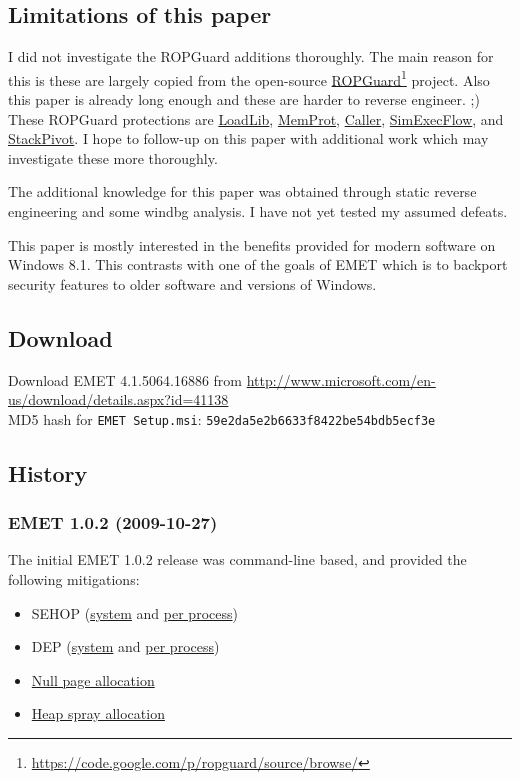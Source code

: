 \documentclass[]{article}
\newcommand{\fhref}[2]{\href{#1}{#2}\footnote{\url{#1}}}
\begin{document}
\subsection{Limitations of this paper}
I did not investigate the ROPGuard additions thoroughly.  The main reason for this is these are largely copied from the open-source  \fhref{https://code.google.com/p/ropguard/source/browse/}{ROPGuard}\cite{ropguard_source} project.  Also this paper is already long enough and these are harder to reverse engineer. ;)  These ROPGuard protections are \hyperref[loadlib]{LoadLib}, \hyperref[memprot]{MemProt}, \hyperref[caller]{Caller}, \hyperref[simexecflow]{SimExecFlow}, and \hyperref[stackpivot]{StackPivot}.  I hope to follow-up on this paper with additional work which may investigate these more thoroughly.

The additional knowledge for this paper was obtained through static reverse engineering and some windbg analysis.  I have not yet tested my assumed defeats.

This paper is mostly interested in the benefits provided for modern software on Windows 8.1.
This contrasts with one of the goals of EMET which is to backport security features to older software and versions of Windows.






\subsection{Download}\label{download}

Download EMET 4.1.5064.16886 from
\url{http://www.microsoft.com/en-us/download/details.aspx?id=41138}
\\MD5 hash for \texttt{EMET Setup.msi}: \texttt{59e2da5e2b6633f8422be54bdb5ecf3e}




\subsection{History}\label{history}

\subsubsection{EMET 1.0.2 (2009-10-27)}\label{emet-1.0.2-2009-10-27}
The initial EMET 1.0.2 release\cite{emet1_0} was command-line based, and
provided the following mitigations:

\begin{itemize}
\item
  SEHOP (\hyperref[system_sehop]{system} and \hyperref[sehop]{per
  process})
\item
  DEP (\hyperref[system_dep]{system} and \hyperref[dep]{per process})
\item
  \hyperref[nullpage]{Null page allocation}
\item
  \hyperref[heapspray]{Heap spray allocation}
\end{itemize}
\end{document}
